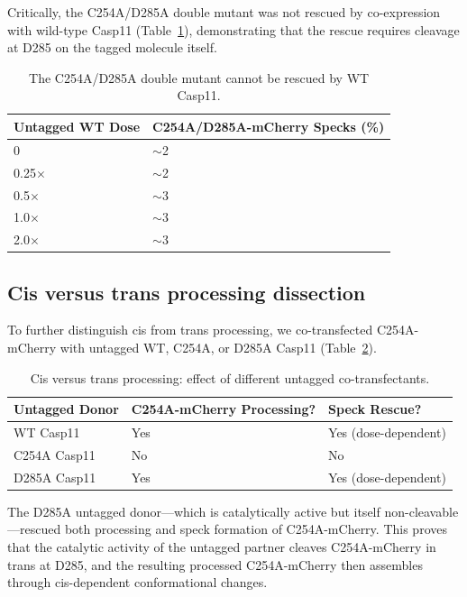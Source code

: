 \documentclass[11pt,a4paper]{article}
\begin{document}
Critically, the C254A/D285A double mutant was not rescued by co-expression with wild-type Casp11 (Table~\ref{tab:double_rescue}), demonstrating that the rescue requires cleavage at D285 on the tagged molecule itself.

\begin{table}[htbp]
\centering
\caption{The C254A/D285A double mutant cannot be rescued by WT Casp11.}
\label{tab:double_rescue}
\begin{tabular}{ll}
\toprule
\textbf{Untagged WT Dose} & \textbf{C254A/D285A-mCherry Specks (\%)} \\
\midrule
0 & $\sim$2 \\
0.25$\times$ & $\sim$2 \\
0.5$\times$ & $\sim$3 \\
1.0$\times$ & $\sim$3 \\
2.0$\times$ & $\sim$3 \\
\bottomrule
\end{tabular}
\end{table}

\subsection{Cis versus trans processing dissection}

To further distinguish cis from trans processing, we co-transfected C254A-mCherry with untagged WT, C254A, or D285A Casp11 (Table~\ref{tab:cis_trans}).

\begin{table}[htbp]
\centering
\caption{Cis versus trans processing: effect of different untagged co-transfectants.}
\label{tab:cis_trans}
\begin{tabular}{lll}
\toprule
\textbf{Untagged Donor} & \textbf{C254A-mCherry Processing?} & \textbf{Speck Rescue?} \\
\midrule
WT Casp11 & Yes & Yes (dose-dependent) \\
C254A Casp11 & No & No \\
D285A Casp11 & Yes & Yes (dose-dependent) \\
\bottomrule
\end{tabular}
\end{table}

The D285A untagged donor---which is catalytically active but itself non-cleavable---rescued both processing and speck formation of C254A-mCherry. This proves that the catalytic activity of the untagged partner cleaves C254A-mCherry in trans at D285, and the resulting processed C254A-mCherry then assembles through cis-dependent conformational changes.
\end{document}

